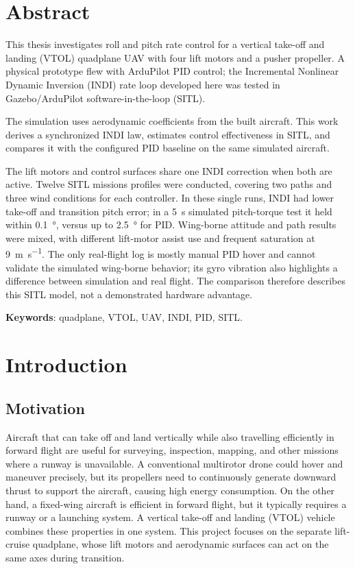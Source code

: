 \documentclass{article}
\begin{document}
\section*{Abstract}
This thesis investigates roll and pitch rate control for a vertical take-off and landing (VTOL) quadplane UAV with four lift motors and a pusher propeller. A physical prototype flew with ArduPilot PID control; the Incremental Nonlinear Dynamic Inversion (INDI) rate loop developed here was tested in Gazebo/ArduPilot software-in-the-loop (SITL).

The simulation uses aerodynamic coefficients from the built aircraft. This work derives a synchronized INDI law, estimates control effectiveness in SITL, and compares it with the configured PID baseline on the same simulated aircraft.

The lift motors and control surfaces share one INDI correction when both are active. Twelve SITL missions profiles were conducted, covering two paths and three wind conditions for each controller. In these single runs, INDI had lower take-off and transition pitch error; in a \SI{5}{\second} simulated pitch-torque test it held within \SI{0.1}{\degree}, versus up to \SI{2.5}{\degree} for PID. Wing-borne attitude and path results were mixed, with different lift-motor assist use and frequent saturation at \SI{9}{\meter\per\second}. The only real-flight log is mostly manual PID hover and cannot validate the simulated wing-borne behavior; its gyro vibration also highlights a difference between simulation and real flight. The comparison therefore describes this SITL model, not a demonstrated hardware advantage.

\noindent\textbf{Keywords}: quadplane, VTOL, UAV, INDI, PID, SITL.



\clearpage

\section{Introduction}
\label{sec:introduction}

\subsection{Motivation}
Aircraft that can take off and land vertically while also travelling efficiently in forward flight are useful for surveying, inspection, mapping, and other missions where a runway is unavailable.
A conventional multirotor drone could hover and maneuver precisely, but its propellers need to continuously generate downward thrust to support the aircraft, causing high energy consumption. On the other hand, a fixed-wing aircraft is efficient in forward flight, but it typically requires a runway or a launching system. A vertical take-off and landing (VTOL) vehicle combines these properties in one system.
This project focuses on the separate lift-cruise quadplane, whose lift motors and aerodynamic surfaces can act on the same axes during transition.
\end{document}
